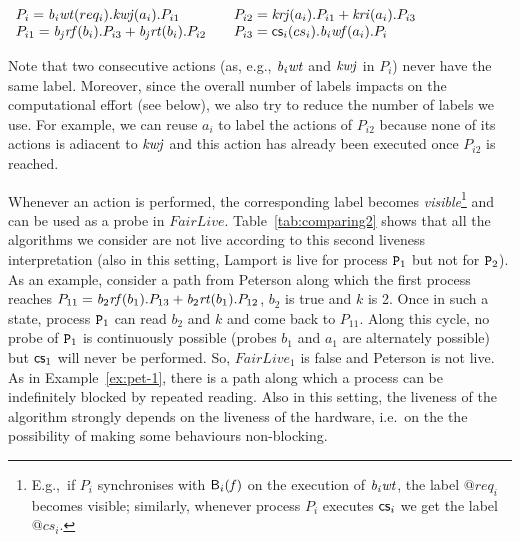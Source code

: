 \documentclass[copyright,creativecommons]{eptcs}
\newcommand{\fa}{\mathit{f}}
\newcommand{\Bv}{{\sf B}}
\newcommand{\rtb}[1]{{\it b_{{\rm #1}}rt}}
\newcommand{\rfb}[1]{{\it b_{{\rm #1}}rf}}
\newcommand{\wtb}[1]{{\it b_{{\rm #1}}wt}}
\newcommand{\wfb}[1]{{\it b_{{\rm #1}}wf}}
\newcommand{\rk}[1]{{\it kr #1}}
\newcommand{\wk}[1]{{\it kw #1}}
\newcommand{\cs}{{\sf cs}}
\newcommand{\proc}{{\tt P}}
\begin{document}
\hspace{2.5cm}
$\begin{array}{l l}
P_i= \wtb{\it i}(req_i).\wk{j}(a_i). P_{i1} &
P_{i2}= \rk{j}(a_{i}).P_{i1} + \rk{i}(a_{i}).P_{i3}\\
P_{i1}= \rfb{\it j}(b_{i}). P_{i3} + \rtb{\it j}(b_{i}).P_{i2} \quad &
P_{i3}=  \cs_i(cs_i).\wfb{\it i}(a_{i}).P_{i}
\end{array}$

Note that two consecutive actions (as, e.g., $\wtb{\it i}$ and $\wk{j}$ in
$P_i$) never have the same label. Moreover, since the overall number of
labels impacts on the computational effort (see below), we also try to
reduce the number of labels we use.  For example, we can reuse $a_i$ to
label the actions of $P_{i2}$ because none of its actions is adiacent to
$\wk{j}$ and this action has already been executed once $P_{i2}$ is
reached. 

Whenever an action is performed, the corresponding label becomes {\it
visible}\footnote{E.g.,\ if $P_i$ synchronises with $\Bv_i(\fa)$ on the
execution of $\wtb{\it i}$, the label $@req_i$ becomes visible; similarly,
whenever process $P_i$ executes $\cs_i$ we get the label $@cs_i$.} and can
be used as a probe in $FairLive$. 
Table~\ref{tab:comparing2} shows that all the algorithms we consider are
not live according to this second liveness interpretation (also in this
setting, Lamport is live for process $\proc_1$ but not for $\proc_2$). As
an example, consider a path from Peterson along
which the first process reaches $P_{11} = \rfb{2}(b_{1}). P_{13} +
\rtb{2}(b_{1}).P_{12}$, $b_2$ is true and $k$ is 2. Once in such a state,
process $\proc_1$ can read $b_2$ and $k$ and come back to $P_{11}$. Along
this cycle, no probe of $\proc_1$ is continuously possible (probes
$b_1$ and $a_1$ are alternately possible) but $\cs_1$ will never be
performed. So, $FairLive_1$ is false and Peterson is not live. As in
Example~\ref{ex:pet-1}, there is a path along which a
process can be indefinitely blocked by repeated reading. Also in this
setting, the liveness of the algorithm strongly depends on the liveness of
the hardware, i.e.\ on the the possibility of making some behaviours
non-blocking.
\end{document}
